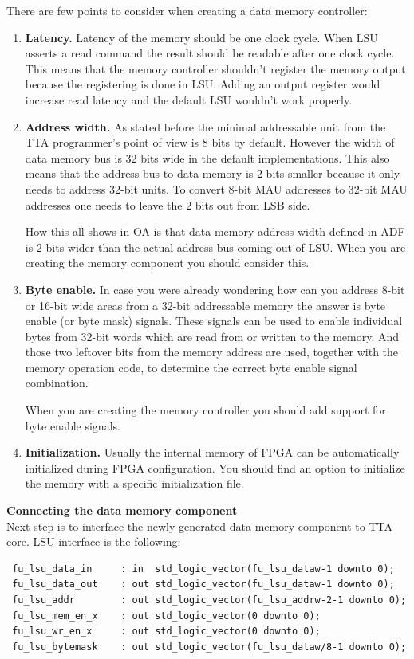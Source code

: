 \documentclass[a4paper,twoside]{tceusermanual}
\begin{document}
There are few points to consider when creating a data memory controller:
\begin{enumerate}
 \item%
 \textbf{Latency.} Latency of the memory should be one clock cycle. When LSU 
 asserts a read command the result should be readable after one clock
 cycle. This means that the memory controller shouldn't register the memory
 output because the registering is done in LSU. Adding an output register
 would increase read latency and the default LSU wouldn't work properly.
\item%
 \textbf{Address width.}
 As stated before the minimal addressable unit from the TTA programmer's point
 of view is 8 bits by default. However the width of data memory bus is 32 bits
 wide in the default implementations. This also means that the address bus to
 data memory is 2 bits smaller because it only needs to address 32-bit units.
 To convert 8-bit MAU addresses to 32-bit MAU addresses one needs to leave the
 2 bits out from LSB side.

 How this all shows in OA is that data memory address width defined in ADF is
 2 bits wider than the actual address bus coming out of LSU. When you are
 creating the memory component you should consider this.
\item%
 \textbf{Byte enable.}
 In case you were already wondering how can you address 8-bit or 16-bit wide
 areas from a 32-bit addressable memory the answer is byte enable (or byte
 mask) signals. These signals can be used to enable individual bytes from
 32-bit words which are read from or written to the memory. And those two
 leftover bits from the memory address are used, together with the memory
 operation code, to determine the correct byte enable signal combination.

 When you are creating the memory controller you should add support for byte
 enable signals.
\item%
 \textbf{Initialization.}
 Usually the internal memory of FPGA can be automatically initialized during
 FPGA configuration. You should find an option to initialize the memory with
 a specific initialization file.
\end{enumerate}

\textbf{Connecting the data memory component} \\
Next step is to interface the newly generated data memory component to TTA
core. LSU interface is the following:
\begin{verbatim}
 fu_lsu_data_in     : in  std_logic_vector(fu_lsu_dataw-1 downto 0);
 fu_lsu_data_out    : out std_logic_vector(fu_lsu_dataw-1 downto 0);
 fu_lsu_addr        : out std_logic_vector(fu_lsu_addrw-2-1 downto 0);
 fu_lsu_mem_en_x    : out std_logic_vector(0 downto 0);
 fu_lsu_wr_en_x     : out std_logic_vector(0 downto 0);
 fu_lsu_bytemask    : out std_logic_vector(fu_lsu_dataw/8-1 downto 0);
\end{verbatim}
\end{document}
